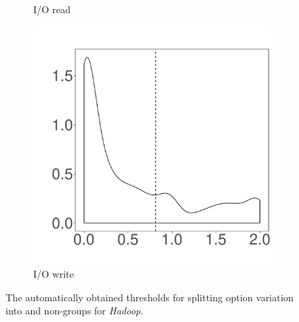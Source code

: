 \begin{figure}[t]
\begin{subfigure}{0.19\textwidth}
                \caption{I/O read}
        \end{subfigure}
        \begin{subfigure}{0.19\textwidth}
                \includegraphics[width=\linewidth]{Figures/iowrite-hadoop-cluster.pdf}
                \caption{I/O write}
        \end{subfigure}
        
	\caption{The automatically obtained thresholds for splitting option variation into \inconsistent and non-\inconsistent groups for \emph{Hadoop}.} %
	\label{fig:threshold_hadoop}
\end{figure}

